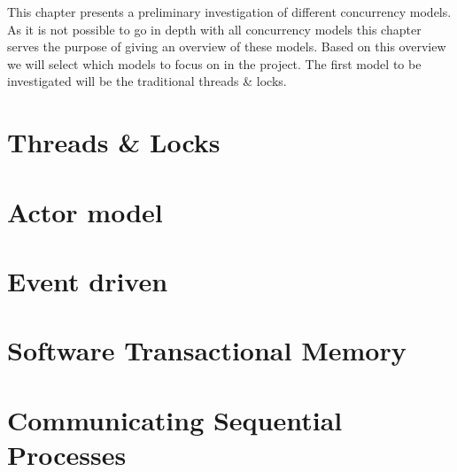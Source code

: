 \makeatletter {}\makeatother
{}
This chapter presents a preliminary investigation of different concurrency models. As it is not possible to go in depth with all concurrency models this chapter serves the purpose of giving an overview of these models. Based on this overview we will select which models to focus on in the project. The first model to be investigated will be the traditional threads \& locks.

\section{Threads \& Locks}
\section{Actor model}
\section{Event driven}
\section{Software Transactional Memory}
\section{Communicating Sequential Processes}

\worksheetend
